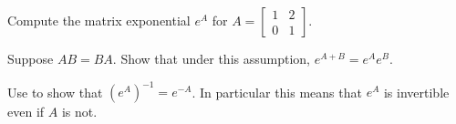 \documentclass{ximera}
\begin{document}
\begin{exercise}
    Compute the matrix exponential $e^A$ for $A = 
    \left[ 
        \begin{smallmatrix} 
            1 & 2 \\ 
            0 & 1 
        \end{smallmatrix} 
    \right]$.
\end{exercise}

\begin{exercise}%
    Suppose $AB = BA$.  Show that under this assumption, $e^{A+B} = e^A e^B$.
\end{exercise}

\begin{exercise} \label{matexp:expinvex}
    Use  to show that ${(e^{A})}^{-1} = e^{-A}$.  In particular this means that $e^A$ is invertible even if $A$ is not.
\end{exercise}
\end{document}
